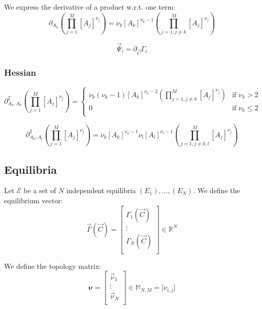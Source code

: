 \documentclass[aps,12pt]{revtex4}
\begin{document}
We express the derivative of a product w.r.t. one term:
\begin{equation}
	\partial_{A_k} \left( \prod_{j=1}^{M} [A_j]^{\nu_{j}} \right)  =
	\nu_k [A_k]^{\nu_k-1} \left( \prod_{j=1,j\not=k}^{M} [A_j]^{\nu_{j}} \right)
\end{equation}
 
 \begin{equation}
	\vec{\Psi}_i = \partial_{\vec{C}} \Gamma_i
\end{equation}

\subsubsection{Hessian}
\begin{equation}
	\partial^2_{A_k,A_k}  \left( \prod_{j=1}^{M} [A_j]^{\nu_{j}} \right) =
	\left\lbrace
	\begin{array}{cl}
	\displaystyle \nu_k(\nu_k-1) [A_k]^{\nu_k-2} \left( \prod_{j=1,j\not=k}^{M} [A_j]^{\nu_{j}} \right) & \text{if $\nu_k>2$}\\
	0 & \text{if $\nu_k\leq2$}\\
	\end{array}
	\right.
\end{equation} 
 
 \begin{equation}
	\partial^2_{A_k,A_l}  \left( \prod_{j=1}^{M} [A_j]^{\nu_{j}} \right) 
 = \nu_k [A_k]^{\nu_k-1} 
   \nu_l [A_l]^{\nu_l-1}
 \left( \prod_{j=1,j\not=k,l}^{M} [A_j]^{\nu_{j}} \right)
\end{equation}
 

\subsection{Equilibria}
Let $\mathcal{E}$ be a set of $N$ independent equilibria $(E_1),\dots,(E_N)$.
We define the equilibrium vector:
\begin{equation}
	\vec{\Gamma}(\vec{C}) =
	\begin{bmatrix}
	\Gamma_1(\vec{C})\\
	\vdots\\
	\Gamma_N(\vec{C})\\
	\end{bmatrix}
	\in \mathbb{R}^N
\end{equation}

We define the topology matrix:
\begin{equation}
	\bm{\nu} = 
	\begin{bmatrix}
	\vec{\nu}_1\\
	\vdots\\
	\vec{\nu}_N\\
	\end{bmatrix}
	\in \mathbb{M}_{N,M}
	= \lbrack \nu_{i,j} \rbrack
\end{equation}
\end{document}
